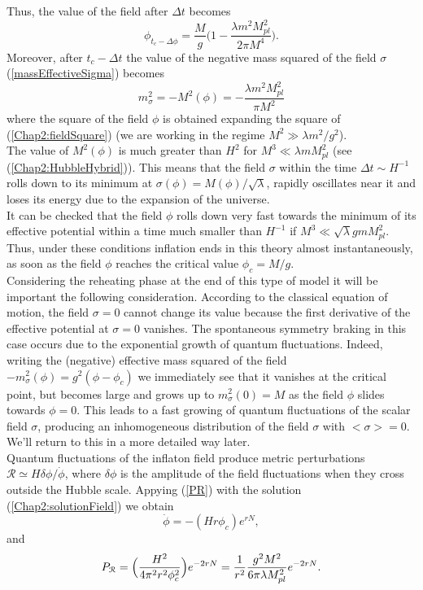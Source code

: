 \documentclass[11pt,a4paper,twoside]{book}
\begin{document}
Thus, the value of the field after $\Delta t$ becomes
\begin{equation}
	\label{Chap2:fieldSquare}
	\phi_{t_{c}-\Delta\phi}=\frac{M}{g}\Big (1-\frac{\lambda m^{2} M^{2}_{pl}} {2\pi M^{4}} \Big ).
\end{equation}
Moreover, after $ t_{c} - \Delta t $ the value of the negative mass squared of the field $\sigma$ (\ref{massEffectiveSigma}) becomes
\begin{equation}
	\label{Chap2}
	m^{2}_{\sigma} = - M^{2}(\phi) = - \frac{\lambda m^{2}M^{2}_{pl}}{\pi M^{2}} 
\end{equation}
where the square of the field $\phi$ is obtained expanding the square of (\ref{Chap2:fieldSquare}) (we are working in the regime $ M^{2} \gg \lambda m^{2}/g^{2} $).\\
The value of $ M^{2}(\phi) $ is much greater than $ H^{2} $ for $ M^{3} \ll \lambda m M_{pl}^{2} $ (see (\ref{Chap2:HubbleHybrid})). This means that the field $\sigma$ within the time $\Delta t \sim H^{-1} $ rolls down to its minimum at $\sigma (\phi) = M(\phi)/\sqrt{\lambda}$, rapidly oscillates near it and loses its energy  due to the expansion of the universe.\\
It can be checked that the field $\phi$ rolls down very fast towards the minimum of its effective potential within a time much smaller than $ H^{-1} $ if $ M^{3} \ll \sqrt{\lambda}gmM_{pl}^{2} $.\\
Thus, under these conditions inflation ends in this theory almost instantaneously, as soon as the field $\phi$ reaches the critical value $\phi_{c} = M/g$.\\
Considering the reheating phase at the end of this type of model it will be important the following consideration. According to the classical equation of motion, the field $ \sigma=0 $ cannot change its value because the first derivative of the effective potential at $\sigma=0$ vanishes. The spontaneous symmetry braking  in this case occurs due to the exponential growth of quantum fluctuations. Indeed, writing the (negative) effective mass squared of the field $ -m^{2}_{\sigma}(\phi)=g^{2}(\phi-\phi_{c}) $ we immediately see that it vanishes at the critical point, but becomes large and grows up to $ m^{2}_{\sigma}(0) = M $ as the field $\phi$ slides towards $\phi=0$. This leads to a fast growing of quantum fluctuations of the scalar field $\sigma$, producing an inhomogeneous distribution of the field $\sigma$ with $ <\sigma>=0 $. We'll return to this in a more detailed way later. \\
Quantum fluctuations of the inflaton field produce metric perturbations $ \mathcal{R} \simeq H\delta\phi/\dot{\phi} $, where $\delta \phi$ is the amplitude of the field fluctuations when they cross outside the Hubble scale.
Appying (\ref{PR}) with the solution (\ref{Chap2:solutionField}) we obtain
\begin{equation}
\dot{\phi}=-(Hr\phi_{c})e^{rN},	
\end{equation}
and 
\begin{equation}
	\label{Chap2:P_{R}}
	P_{\mathcal{R}}=\Big (\frac{H^{2}}{4\pi^{2}r^{2}\phi_{c}^{2}}\Big)e^{-2rN} = \frac{1}{r^{2}}\frac{g^{2}M^{2}}{6\pi\lambda M_{pl}^{2}}e^{-2rN}.
\end{equation}
\end{document}
